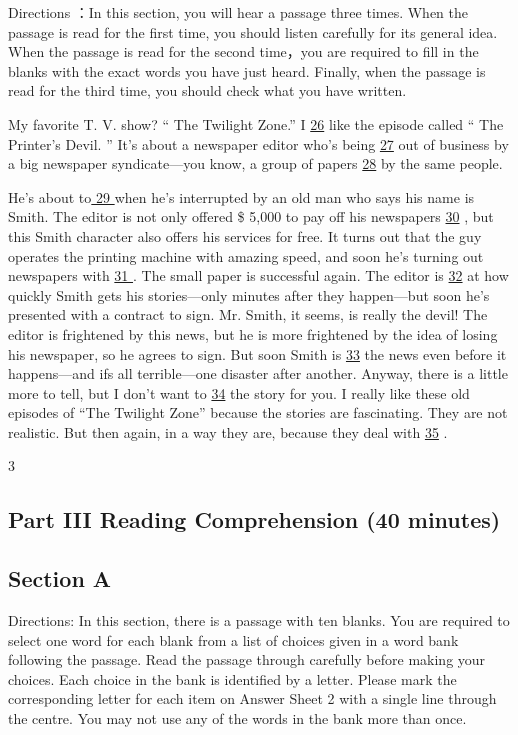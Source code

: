 \documentclass[UTF8,11pt]{ctexart}
\begin{document}
Directions ：In this section, you will hear a passage three times. When the passage is read for the first time, you should listen carefully for its general idea. When the passage is read for the second time，you are required to fill in the blanks with the exact words you have just heard. Finally, when the passage is read for the third time, you should check what you have written.


My favorite T. V. show? “ The Twilight Zone.” I \uline{26} like the episode called “ The Printer’s Devil. ” It’s about a newspaper editor who’s being \uline{27} out of business by a big newspaper syndicate—you know, a group of papers \uline{28} by the same people.


He’s about to\uline{ 29 }when he’s interrupted by an old man who says his name is Smith. The editor is not only offered \$ 5,000 to pay off his newspapers \uline{30} , but this Smith character also offers his services for free. It turns out that the guy operates the printing machine with amazing speed, and soon he’s turning out newspapers with \uline{31 }. The small paper is successful again. The editor is \uline{32} at how quickly Smith gets his stories—only minutes after they happen—but soon he’s presented with a contract to sign. Mr. Smith, it seems, is really the devil! The editor is frightened by this news, but he is more frightened by the idea of losing his newspaper, so he agrees to sign. But soon Smith is \uline{33} the news even before it happens—and ifs all terrible—one disaster after another. Anyway, there is a little more to tell, but I don’t want to \uline{34} the story for you. I really like these old episodes of “The Twilight Zone” because the stories are fascinating. They are not realistic. But then again, in a way they are, because they deal with \uline{35} .


3


\subsection*{\textbf{Part III} \textbf{Reading Comprehension} \textbf{(40 minutes)}}


\subsection*{\textbf{Section A}}


Directions: In this section, there is a passage with ten blanks. You are required to select one word for each blank from a list of choices given in a word bank following the passage. Read the passage through carefully before making your choices. Each choice in the bank is identified by a letter. Please mark the corresponding letter for each item on Answer Sheet 2 with a single line through the centre. You may not use any of the words in the bank more than once.
\end{document}

